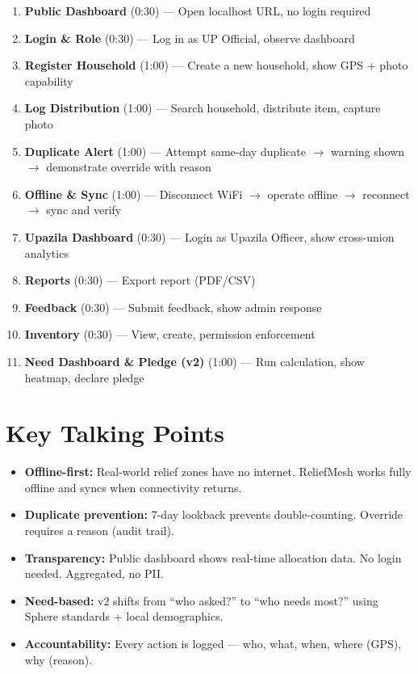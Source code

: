 \begin{enumerate}[nosep]
    \item \textbf{Public Dashboard} (0:30) --- Open localhost URL, no login required
    \item \textbf{Login \& Role} (0:30) --- Log in as UP Official, observe dashboard
    \item \textbf{Register Household} (1:00) --- Create a new household, show GPS + photo capability
    \item \textbf{Log Distribution} (1:00) --- Search household, distribute item, capture photo
    \item \textbf{Duplicate Alert} (1:00) --- Attempt same-day duplicate $\rightarrow$ warning shown $\rightarrow$ demonstrate override with reason
    \item \textbf{Offline \& Sync} (1:00) --- Disconnect WiFi $\rightarrow$ operate offline $\rightarrow$ reconnect $\rightarrow$ sync and verify
    \item \textbf{Upazila Dashboard} (0:30) --- Login as Upazila Officer, show cross-union analytics
    \item \textbf{Reports} (0:30) --- Export report (PDF/CSV)
    \item \textbf{Feedback} (0:30) --- Submit feedback, show admin response
    \item \textbf{Inventory} (0:30) --- View, create, permission enforcement
    \item \textbf{Need Dashboard \& Pledge (v2)} (1:00) --- Run calculation, show heatmap, declare pledge
\end{enumerate}

\section{Key Talking Points}
\begin{itemize}[nosep]
    \item \textbf{Offline-first:} Real-world relief zones have no internet. ReliefMesh works fully offline and syncs when connectivity returns.
    \item \textbf{Duplicate prevention:} 7-day lookback prevents double-counting. Override requires a reason (audit trail).
    \item \textbf{Transparency:} Public dashboard shows real-time allocation data. No login needed. Aggregated, no PII.
    \item \textbf{Need-based:} v2 shifts from ``who asked?'' to ``who needs most?'' using Sphere standards + local demographics.
    \item \textbf{Accountability:} Every action is logged --- who, what, when, where (GPS), why (reason).
\end{itemize}

